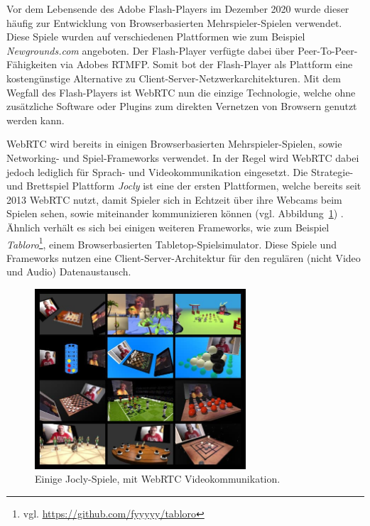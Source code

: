 Vor dem Lebensende des Adobe Flash-Players im Dezember 2020 wurde dieser häufig zur Entwicklung von Browserbasierten Mehrspieler-Spielen verwendet. Diese Spiele wurden auf verschiedenen Plattformen wie zum Beispiel \textit{Newgrounds.com} angeboten. Der Flash-Player verfügte dabei über Peer-To-Peer-Fähigkeiten via Adobes \acf{RTMFP}. Somit bot der Flash-Player als Plattform eine kostengünstige Alternative zu Client-Server-Netzwerkarchitekturen. Mit dem Wegfall des Flash-Players ist WebRTC nun die einzige Technologie, welche ohne zusätzliche Software oder Plugins zum direkten Vernetzen von Browsern genutzt werden kann.\par

\acs{WebRTC} wird bereits in einigen Browserbasierten Mehrspieler-Spielen, sowie Networking- und Spiel-Frameworks verwendet. In der Regel wird WebRTC dabei jedoch lediglich für Sprach- und Videokommunikation eingesetzt. Die Strategie- und Brettspiel Plattform \textit{Jocly} ist eine der ersten Plattformen, welche bereits seit 2013 \acs{WebRTC} nutzt, damit Spieler sich in Echtzeit über ihre Webcams beim Spielen sehen, sowie miteinander kommunizieren können (vgl. Abbildung~\ref{fig:jocly}) \cite{jocly2013}. Ähnlich verhält es sich bei einigen weiteren Frameworks, wie zum Beispiel \textit{Tabloro}\footnote{vgl. \url{https://github.com/fyyyyy/tabloro}}, einem Browserbasierten \glqq{}Tabletop\grqq{}-Spielsimulator. Diese Spiele und Frameworks nutzen eine Client-Server-Architektur für den regulären (nicht Video und Audio) Datenaustausch.\par

\begin{figure}[h]
\centering
\includegraphics[width=0.70\textwidth]{bilder/jocly-games.jpg}
\caption{Einige Jocly-Spiele, mit WebRTC Videokommunikation.}
\label{fig:jocly}
\end{figure}

